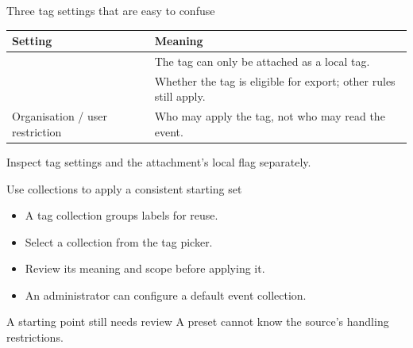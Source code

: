 \begin{frame}{Three tag settings that are easy to confuse}
    \small
    \begin{tabular}{@{}P{2.7cm}P{7.5cm}@{}}
        \toprule
        Setting & Meaning \\
        \midrule
         & The tag can only be attached as a local tag. \\
         & Whether the tag is eligible for export; other rules still apply. \\
        Organisation / user restriction & Who may apply the tag, not who may read the event. \\
        \bottomrule
    \end{tabular}
    \medskip
    Inspect tag settings and the attachment's local flag separately.
\end{frame}

\begin{frame}{Use collections to apply a consistent starting set}
    \begin{itemize}
        \item A tag collection groups labels for reuse.
        \item Select a collection from the tag picker.
        \item Review its meaning and scope before applying it.
        \item An administrator can configure a default event collection.
    \end{itemize}
    \begin{block}{A starting point still needs review}
        A preset cannot know the source's handling restrictions.
    \end{block}
\end{frame}

